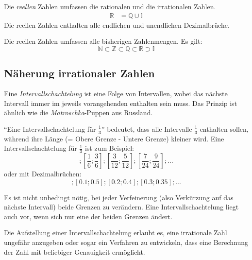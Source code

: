 \begin{defi}
 Die \emph{reellen} Zahlen umfassen die rationalen und die irrationalen Zahlen.
 \begin{align*}
  \mathbb{R} &= \mathbb{Q} \cup \mathbb{I}
 \end{align*}
 Die reellen Zahlen enthalten alle endlichen und unendlichen Dezimalbrüche.
 
 Die reellen Zahlen umfassen alle bisherigen Zahlenmengen. Es gilt:
 \begin{equation*}
  \mathbb{N} \subset \mathbb{Z} \subset \mathbb{Q} \subset \mathbb{R} \supset \mathbb{I}
 \end{equation*}

\end{defi}

\subsection{Näherung irrationaler Zahlen}

\begin{defi}[Intervallschachtelung]
 Eine \emph{Intervallschachtelung} ist eine Folge von Intervallen,
wobei das nächste Intervall immer im jeweils vorangehenden enthalten sein muss.
Das Prinzip ist ähnlich wie die \emph{Matroschka}-Puppen aus Russland.

"`Eine Intervallschachtelung für \(\frac{1}{3}\)"' bedeutet, dass alle Intervalle \(\frac{1}{3}\)
enthalten sollen, während ihre Länge (= Obere Grenze - Untere Grenze)
kleiner wird. Eine Intervallschachtelung für \(\frac{1}{3}\) ist zum Beispiel:
\begin{equation*}
[0;1]; \left[\frac{1}{6};\frac{3}{6}\right]; \left[\frac{3}{12};\frac{5}{12}\right]; \left[\frac{7}{24};\frac{9}{24}\right]; \ldots 
\end{equation*}
oder mit Dezimalbrüchen:
\begin{equation*}
 [0 ; 1]; [0.1 ; 0.5]; [0.2 ; 0.4]; [0.3 ; 0.35]; \ldots
\end{equation*}

Es ist nicht unbedingt nötig, bei jeder Verfeinerung (also Verkürzung
auf das nächste Intervall) beide Grenzen zu verändern. Eine
Intervallschachtelung liegt auch vor, wenn sich nur eine der beiden
Grenzen ändert.

Die Aufstellung einer Intervallschachtelung erlaubt es, eine irrationale Zahl ungefähr anzugeben oder sogar ein Verfahren zu entwickeln, dass eine Berechnung der Zahl mit beliebiger Genauigkeit ermöglicht.
 \end{defi}

